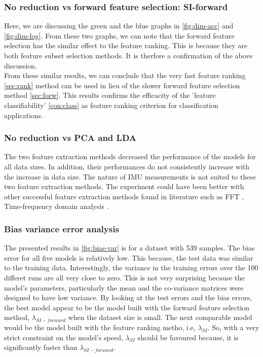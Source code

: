 \subsubsection{No reduction vs forward feature selection: SI-forward}
Here, we are discussing the green and the blue graphs in \ref{fig:dim-acc} and \ref{fig:dim-log}. From these two graphs, we can note that the forward feature selection has the similar effect to the feature ranking. This is because they are both feature subset selection methods. It is therfore a confirmation of the above discussion.\\
From these similar results, we can conclude that the very fast feature ranking \ref{sec:rank} method can be used in lieu of the slower forward feature selection method \ref{sec:forw}. This results confirms the efficacity of the 'feature classifiability' \ref{con:class} as feature ranking criterion for classification applications.

\subsubsection{No reduction vs PCA and LDA}

The two feature extraction methods decreased the performance of the models for all data sizes. In addition, their performances do not consistently increase with the increase in data size. The nature of IMU measurements is not suited to these two feature extraction methods. The experiment could have been better with other successful feature extraction methods found in literature such as FFT \cite{towa2009},
Time-frequency domain analysis \cite{ches2012}.

\subsubsection{Bias variance error analysis}
The presented results in \ref{fig:bias-var} is for a dataset with 539 samples.
The bias error for all five models is relatively low. This because, the test data was similar to the training data. 
Interestingly, the variance in the training errors over the 100 differet runs are all very close to zero. This is not very surprising because the model's parameters, particularly the mean and the co-variance matrices were designed to have low variance. %
By looking at the test errors and the bias errors, the best model appear to be the model built with the forward feature selection method, \(\lambda_{SI-forward}\) when the dataset size is small. The next comparable model would be the model built with the feature ranking metho, i.e, \(\lambda_{SI}\). So, with a very strict constraint on the model's speed, \(\lambda_{SI}\) should be favoured because, it is significantly faster than \(\lambda_{SI-forward}\).

